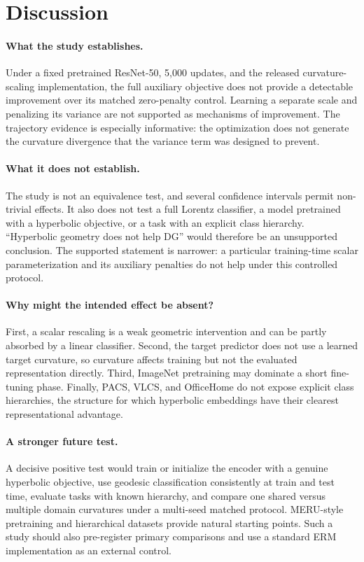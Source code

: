 \documentclass[10pt]{article}
\begin{document}
\section{Discussion}
\label{sec:discussion}

\paragraph{What the study establishes.}
Under a fixed pretrained ResNet-50, 5,000 updates, and the released
curvature-scaling implementation, the full auxiliary objective does not provide
a detectable improvement over its matched zero-penalty control. Learning a
separate scale and penalizing its variance are not supported as mechanisms of
improvement. The trajectory evidence is especially informative: the
optimization does not generate the curvature divergence that the variance term
was designed to prevent.

\paragraph{What it does not establish.}
The study is not an equivalence test, and several confidence intervals permit
non-trivial effects. It also does not test a full Lorentz classifier, a model
pretrained with a hyperbolic objective, or a task with an explicit class
hierarchy. ``Hyperbolic geometry does not help DG'' would therefore be an
unsupported conclusion. The supported statement is narrower: a particular
training-time scalar parameterization and its auxiliary penalties do not help
under this controlled protocol.

\paragraph{Why might the intended effect be absent?}
First, a scalar rescaling is a weak geometric intervention and can be partly
absorbed by a linear classifier. Second, the target predictor does not use a
learned target curvature, so curvature affects training but not the evaluated
representation directly. Third, ImageNet pretraining may dominate a short
fine-tuning phase. Finally, PACS, VLCS, and OfficeHome do not expose explicit
class hierarchies, the structure for which hyperbolic embeddings have their
clearest representational advantage.

\paragraph{A stronger future test.}
A decisive positive test would train or initialize the encoder with a genuine
hyperbolic objective, use geodesic classification consistently at train and
test time, evaluate tasks with known hierarchy, and compare one shared versus
multiple domain curvatures under a multi-seed matched protocol. MERU-style
pretraining \citep{desai2023meru} and hierarchical datasets provide natural
starting points. Such a study should also pre-register primary comparisons and
use a standard ERM implementation as an external control.
\end{document}
